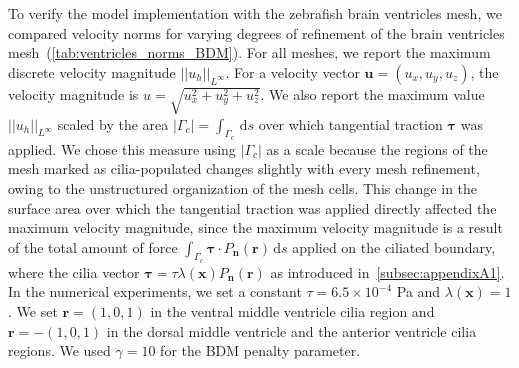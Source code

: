 \documentclass[fleqn]{wlscirep}
\newcommand{\normlinf}[1]{{\vert\vert#1\vert\vert}_{L^{\infty}}}
\newcommand{\intGc}[1]{\int_{\Gamma_c}#1 \, \mathrm ds}
\newcommand{\Gc}{\Gamma_{c}}
\newcommand{\nn}{\mathbf{n}}
\newcommand{\rr}{\mathbf{r}}
\newcommand{\uu}{\mathbf{u}}
\newcommand{\xx}{\bm{x}}
\newcommand{\btau}{\bm{\tau}}
\begin{document}
To verify the model implementation with the zebrafish brain ventricles mesh, we compared velocity norms for varying degrees of refinement of the brain ventricles mesh~(\cref{tab:ventricles_norms_BDM}). For all meshes, we report the maximum discrete velocity magnitude $\normlinf{u_h}$. For a velocity vector $\uu=(u_x, u_y, u_z)$, the velocity magnitude is $u = \sqrt{u_x^2 + u_y^2 + u_z^2}$. We also report the maximum value $\normlinf{u_h}$ scaled by the area $|\Gc|=\intGc{}$ over which tangential traction $\btau$ was applied. We chose this measure using $|\Gc|$ as a scale because the regions of the mesh marked as cilia-populated changes slightly with every mesh refinement, owing to the unstructured organization of the mesh cells. This change in the surface area over which the tangential traction was applied directly affected the maximum velocity magnitude, since the maximum velocity magnitude is a result of the total amount of force $\intGc{\btau\cdot P_{\nn}(\rr)}$ applied on the ciliated boundary, where the cilia vector $\btau = \tau\lambda(\xx) P_{\nn}(\rr)$ as introduced in~\cref{subsec:appendixA1}. In the numerical experiments, we set a constant $\tau = 6.5\times 10^{-4}$ Pa and $\lambda(\xx)=1$. We set $\rr = (1, 0, 1)$ in the ventral middle ventricle cilia region and $\rr = -(1, 0, 1)$ in the dorsal middle ventricle and the anterior ventricle cilia regions. We used $\gamma=10$ for the BDM penalty parameter.
\end{document}
